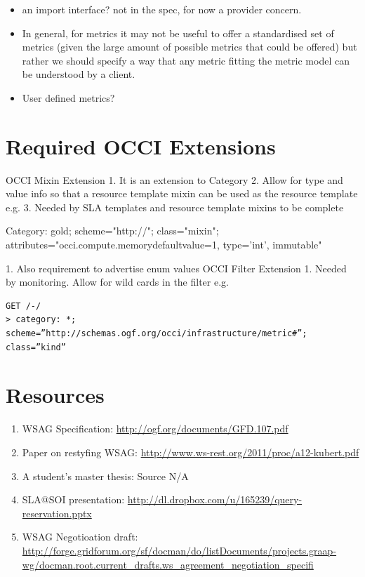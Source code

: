 \documentclass[12pt]{article}  %
\begin{document}
\begin{itemize}
\item an import interface? not in the spec, for now a provider concern.
\item In general, for metrics it may not be useful to offer a standardised set of metrics (given the large amount of possible metrics that could be offered) but rather we should specify a way that any metric fitting the metric model can be understood by a client.
\item User defined metrics?
\end{itemize}

{
\color{green}
\section*{Required OCCI Extensions}
OCCI Mixin Extension
   1. It is an extension to Category
   2. Allow for type and value info so that a resource template mixin can be used as the resource template e.g.
   3. Needed by SLA templates and resource template mixins to be complete




Category: gold; scheme="http://"; class="mixin"; attributes="occi.compute.memory{defaultvalue=1, type='int', immutable}"


   1. Also requirement to advertise enum values
OCCI Filter Extension
   1. Needed by monitoring. Allow for wild cards in the filter e.g.
\begin{verbatim}
GET /-/
> category: *; scheme=”http://schemas.ogf.org/occi/infrastructure/metric#”; class=”kind”
\end{verbatim}
}

\section*{Resources}
\begin{enumerate}
\item WSAG Specification:  \url{http://ogf.org/documents/GFD.107.pdf}
\item Paper on restyfing WSAG: \url{http://www.ws-rest.org/2011/proc/a12-kubert.pdf}
\item A student’s master thesis: Source N/A
\item SLA@SOI presentation: \url{http://dl.dropbox.com/u/165239/query-reservation.pptx}
\item WSAG Negotioation draft: \url{http://forge.gridforum.org/sf/docman/do/listDocuments/projects.graap-wg/docman.root.current_drafts.ws_agreement_negotiation_specifi}
\end{enumerate}
\end{document}
